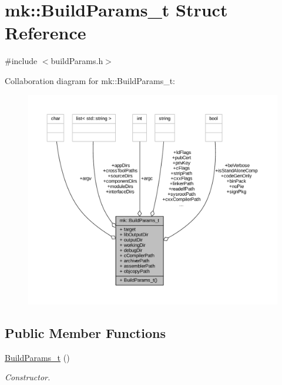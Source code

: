 \hypertarget{structmk_1_1_build_params__t}{}\section{mk\+:\+:Build\+Params\+\_\+t Struct Reference}
\label{structmk_1_1_build_params__t}


{\ttfamily \#include $<$build\+Params.\+h$>$}



Collaboration diagram for mk\+:\+:Build\+Params\+\_\+t\+:
\nopagebreak
\begin{figure}[H]
\begin{center}
\leavevmode
\includegraphics[width=350pt]{structmk_1_1_build_params__t__coll__graph}
\end{center}
\end{figure}
\subsection*{Public Member Functions}
\begin{DoxyCompactItemize}
\item 
\hyperlink{structmk_1_1_build_params__t_acc6e55f50d60386c820849ea0b0e013f}{Build\+Params\+\_\+t} ()
\begin{DoxyCompactList}\small\item\em Constructor. \end{DoxyCompactList}\end{DoxyCompactItemize}
